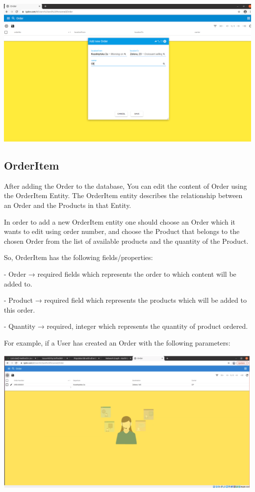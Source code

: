 \includegraphics[width=\textwidth]{sections/01-chapter/images/order4.png}

\subsection{OrderItem}

After adding the Order to the database, You can edit the content of Order using the OrderItem Entity. The OrderItem entity describes the relationship between an Order and the Products in that Entity. 

In order to add a new OrderItem entity one should choose an Order which it wants to edit using order number, and choose the Product that belongs to the chosen Order from the list of available products and the quantity of the Product. 

So, OrderItem has the following fields/properties:


- Order →  required fields which represents the order to which content will be added to.

- Product →  required field which represents the products which will be added to this order.

- Quantity →  required, integer which represents the quantity of product ordered.


For example, if a User has created an Order with the following parameters:

\includegraphics[width=\textwidth]{sections/01-chapter/images/orderitem1.png}

